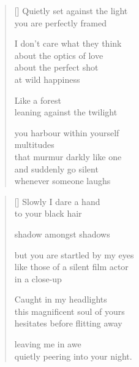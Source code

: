\documentclass[14pt]{extbook}
\newcommand*{\centeredornament}{\centerline{\pgfornament[width=6cm]{88}}}
\begin{document}

\newpage

\vspace*{-15mm}
\centeredornament
\vspace*{-7mm}


\settowidth{\versewidth}{that murmur darkly like one}

\begin{verse}[\versewidth]
  Quietly set against the light \\
  you are perfectly framed

  I don't care what they think \\
  about the optics of love \\
  about the perfect shot \\
  at wild happiness

  Like a forest \\
  leaning against the twilight

  you harbour within yourself \\
  multitudes \\
  that murmur darkly like one \\
  and suddenly go silent \\
  whenever someone laughs
\end{verse}

\newpage

\settowidth{\versewidth}{but you are startled by my eyes}

\begin{verse}[\versewidth]
  Slowly I dare a hand \\
  to your black hair

  shadow amongst shadows

  but you are startled by my eyes \\
  like those of a silent film actor \\
  in a close-up

  Caught in my headlights \\
  this magnificent soul of yours \\
  hesitates before flitting away

  leaving me in awe \\
  quietly peering into your night.
\end{verse}

\end{document}
